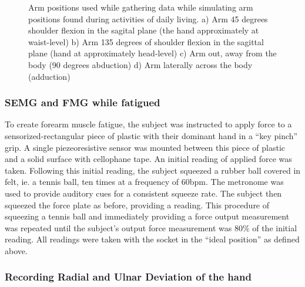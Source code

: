 \documentclass[twocolumn]{sagej}
\begin{document}
\begin{figure}[htbp]
\centering
{}
\caption{Arm positions used while gathering data while simulating arm positions found during activities of daily living. a) Arm 45 degrees shoulder flexion in the sagital plane (the hand approximately at waist-level) b) Arm 135 degrees of shoulder flexion in the sagittal plane (hand at approximately head-level) c) Arm out, away from the body (90 degrees abduction) d) Arm laterally across the body (adduction)}

\end{figure}

\subsubsection{SEMG and FMG while fatigued}
\label{sec:exp_prot-fatigued}

To create forearm muscle fatigue, the subject was instructed to apply force to a sensorized-rectangular piece of plastic with their dominant hand in a ``key pinch'' grip.  A single piezeoresistive sensor was mounted between this piece of plastic and a solid surface with cellophane tape.  An initial reading of applied force was taken.  Following this initial reading, the subject squeezed a rubber ball covered in felt, ie. a tennis ball, ten times at a frequency of 60bpm. The metronome was used to provide auditory cues for a consistent squeeze rate.  The subject then squeezed the force plate as before, providing a reading.  This procedure of squeezing a tennis ball and immediately providing a force output measurement was repeated until the subject's output force measurement was 80\% of the initial reading.  All readings were taken with the socket in the ``ideal position'' as defined above.\par \noindent

\subsubsection{Recording Radial and Ulnar Deviation of the hand}
\label{sec:exp_prot-hammer}
\end{document}
